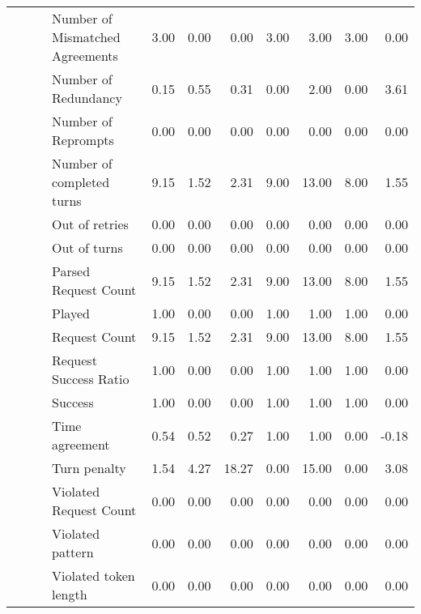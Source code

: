 \begin{tabular}{llllrrrrrrr}
 &  &  & Number of Mismatched Agreements & 3.00 & 0.00 & 0.00 & 3.00 & 3.00 & 3.00 & 0.00 \\
 &  &  & Number of Redundancy & 0.15 & 0.55 & 0.31 & 0.00 & 2.00 & 0.00 & 3.61 \\
 &  &  & Number of Reprompts & 0.00 & 0.00 & 0.00 & 0.00 & 0.00 & 0.00 & 0.00 \\
 &  &  & Number of completed turns & 9.15 & 1.52 & 2.31 & 9.00 & 13.00 & 8.00 & 1.55 \\
 &  &  & Out of retries & 0.00 & 0.00 & 0.00 & 0.00 & 0.00 & 0.00 & 0.00 \\
 &  &  & Out of turns & 0.00 & 0.00 & 0.00 & 0.00 & 0.00 & 0.00 & 0.00 \\
 &  &  & Parsed Request Count & 9.15 & 1.52 & 2.31 & 9.00 & 13.00 & 8.00 & 1.55 \\
 &  &  & Played & 1.00 & 0.00 & 0.00 & 1.00 & 1.00 & 1.00 & 0.00 \\
 &  &  & Request Count & 9.15 & 1.52 & 2.31 & 9.00 & 13.00 & 8.00 & 1.55 \\
 &  &  & Request Success Ratio & 1.00 & 0.00 & 0.00 & 1.00 & 1.00 & 1.00 & 0.00 \\
 &  &  & Success & 1.00 & 0.00 & 0.00 & 1.00 & 1.00 & 1.00 & 0.00 \\
 &  &  & Time agreement & 0.54 & 0.52 & 0.27 & 1.00 & 1.00 & 0.00 & -0.18 \\
 &  &  & Turn penalty & 1.54 & 4.27 & 18.27 & 0.00 & 15.00 & 0.00 & 3.08 \\
 &  &  & Violated Request Count & 0.00 & 0.00 & 0.00 & 0.00 & 0.00 & 0.00 & 0.00 \\
 &  &  & Violated pattern & 0.00 & 0.00 & 0.00 & 0.00 & 0.00 & 0.00 & 0.00 \\
 &  &  & Violated token length & 0.00 & 0.00 & 0.00 & 0.00 & 0.00 & 0.00 & 0.00 \\
\cline{1-11} \cline{2-11} \cline{3-11}
\bottomrule
\end{tabular}
